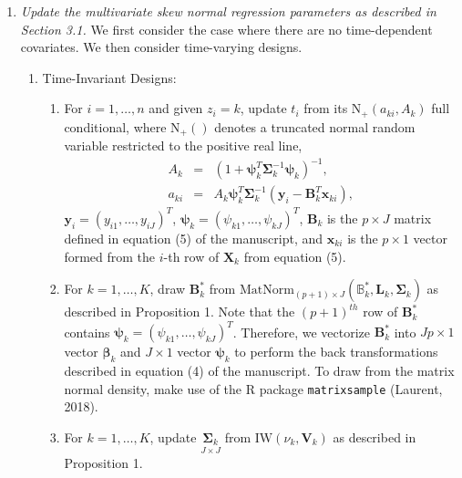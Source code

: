 \documentclass[useAMS,11pt]{article}
\newcommand{\1}{\mathbbm{1}}
\begin{document}
\begin{enumerate}
\item \textit{Update the multivariate skew normal regression parameters as described in Section 3.1.} We first consider the case where there are no time-dependent covariates. We then consider time-varying designs.
     \begin{enumerate}
      \item Time-Invariant Designs:
      \begin{enumerate}
      \item For $i=1,\ldots,n$ and given $z_i=k$, update $t_i$ from its $\text{N}_{+}(a_{ki},A_{k})$ full conditional, where $\text{N}_{+}()$ denotes a truncated normal random variable restricted to the positive real line,
          \begin{eqnarray*}
          A_k&=&(1 + \boldsymbol\psi_k^T \boldsymbol\Sigma_k^{-1} \boldsymbol\psi_k)^{-1},\\
          a_{ki}&=&A_k \boldsymbol\psi_k^T \boldsymbol\Sigma_k^{-1} (\mathbf{y}_i - \mathbf{B}_k^T\mathbf{x}_{ki}),
          \end{eqnarray*}
          $\mathbf{y}_{i}=(y_{i1},\ldots,y_{iJ})^T$, $\boldsymbol\psi_k=(\psi_{k1},\ldots,\psi_{kJ})^T$, $\mathbf{B}_k$ is the $p \times J$ matrix defined in equation (5) of the manuscript, and $\mathbf{x}_{ki}$ is the $p\times 1$ vector formed from the $i$-th row of $\mathbf{X}_k$ from equation (5).\vspace{2pt}
      \item  For $k=1,\ldots,K$, draw $\mathbf{B}^*_k$ from $\text{MatNorm}_{(p+1)\times J}(\mathbb{B}^*_k,\mathbf{L}_k,\boldsymbol\Sigma_k)$ as described in Proposition 1.  Note that the $(p+1)^{th}$ row of $\mathbf{B}^*_k$ contains $\boldsymbol\psi_k=(\psi_{k1},\ldots,\psi_{kJ})^T$. Therefore, we vectorize $\mathbf{B}^*_k$ into $Jp \times 1$ vector $\boldsymbol\beta_k$ and $J\times 1$ vector $\boldsymbol\psi_k$ to perform the back transformations described in equation (4) of the manuscript. To draw from the matrix normal density, make use of the R package \texttt{matrixsample} (Laurent, 2018). \vspace{2pt}
      \item   For $k=1,\ldots,K$, update $\underset{J\times J}{\boldsymbol\Sigma_k}$ from $\text{IW}(\nu_k,\mathbf{V}_k)$ as described in Proposition 1.
     \end{enumerate}


\end{enumerate}
\end{enumerate}
\end{document}
